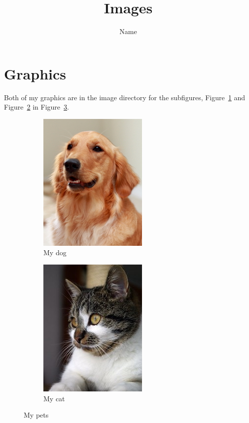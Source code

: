 \documentclass{article}
\title{Images}
\author{Name}
\date{}
\begin{document}
\maketitle
\section{Graphics}

Both of my graphics are in the image directory for the subfigures, Figure~\ref{fig:dog} and Figure~\ref{fig:cat} in Figure~\ref{fig:subs}.

\begin{figure}[ht]
	\centering
	\begin{subfigure}[b]{0.4\textwidth}
		\centering
		\includegraphics[scale=0.8]{dog.jpg}
		\caption{My dog}
		\label{fig:dog}
	\end{subfigure}
	\begin{subfigure}[b]{0.4\textwidth}
		\centering
		\includegraphics[scale=0.8]{cat.jpg}
		\caption{My cat}
		\label{fig:cat}
	\end{subfigure}
	\caption{My pets}
	\label{fig:subs}
\end{figure}
\end{document}
